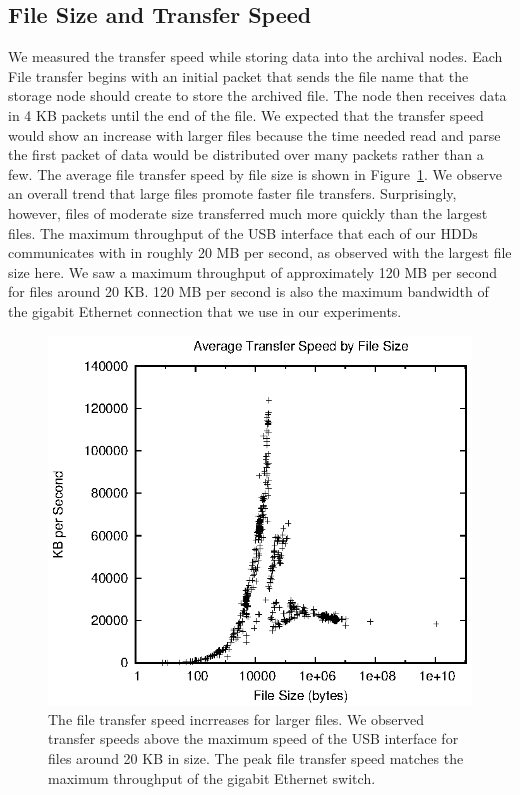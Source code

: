 \subsection{File Size and Transfer Speed}
We measured the transfer speed while storing data into the archival nodes.    Each File transfer begins with an initial packet that sends the file name that the storage node should create to store the archived file.  The node then receives data in 4 KB packets until the end of the file.  We expected that the transfer speed would show an increase with larger files because the time needed read and parse the first packet of data would be distributed over many packets rather than a few.  The average file transfer speed by file size is shown in Figure~\ref{fig6}.  We observe an overall trend that large files promote faster file transfers.  Surprisingly, however, files of moderate size transferred much more quickly than the largest files.  The maximum throughput of the USB interface that each of our HDDs communicates with in roughly 20 MB per second, as observed with the largest file size here.  We saw a maximum throughput of approximately 120 MB per second for files around 20 KB.  120 MB per second is also the maximum bandwidth of the gigabit Ethernet connection that we use in our experiments.

\begin{figure}[!ht]
\includegraphics[width=\linewidth]{fig6.eps}
\caption{The file transfer speed incrreases for larger files.  We observed transfer speeds above the maximum speed of the USB interface for files around 20 KB in size.  The peak file transfer speed matches the maximum throughput of the gigabit Ethernet switch.}
\label{fig6}
\end{figure}

